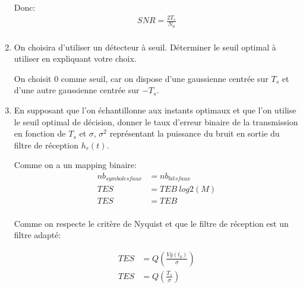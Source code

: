 \documentclass[frenchb]{article}
\begin{document}
\begin{enumerate}
        Donc: 
        \begin{equation*}
        \begin{split}
        \boxed{SNR = \frac{2 T_s}{N_0}}  \\
        \end{split}
        \end{equation*}
        \par\leavevmode\par
        \item On choisira d'utiliser un détecteur à seuil. Déterminer le seuil optimal à utiliser en expliquant votre choix.
        \par\leavevmode\par
        \setlength\parindent{0.5cm}
        On choisit 0 comme seuil, car on dispose d'une gaussienne centrée sur $T_s$ et d'une autre gaussienne centrée sur $- T_s$.
        \par\leavevmode\par
        \item En supposant que l'on échantillonne aux instants optimaux et que l'on utilise le seuil optimal de décision, donner le taux d'erreur binaire de la transmission en fonction de $T_s$ et $\sigma$, $\sigma^2$ représentant la puissance du bruit en sortie du filtre de réception $h_r(t)$.
        
        \par\leavevmode\par
        \setlength\parindent{0.5cm}
        Comme on a un mapping binaire: 
        \begin{equation*}
        \begin{split}
        nb_{symboles faux} &= nb_{bits faux} \\
        TES & = TEB \ log2(M)\\
        TES & = TEB \\
        \end{split}
        \end{equation*}
        
        Comme on respecte le critère de Nyquist et que le filtre de réception est un filtre adapté:
        
        \begin{equation*}
        \begin{split}
        TES & = Q\left(\frac{V g(t_0)}{\sigma} \right) \\
        TES & = Q\left(\frac{T_s}{\sigma} \right) \\ 
        \end{split}
        \end{equation*}
        

\end{enumerate}
\end{document}
